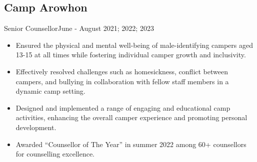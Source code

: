 \subsection{Camp Arowhon}{Senior Counsellor}{June - August 2021; 2022; 2023}
\begin{itemize}
    \item Ensured the physical and mental well-being of male-identifying campers aged 13-15 at all times while fostering individual camper growth and inclusivity. 
    \item Effectively resolved challenges such as homesickness, conflict between campers, and bullying in collaboration with fellow staff members in a dynamic camp setting.
    \item Designed and implemented a range of engaging and educational camp activities, enhancing the overall camper experience and promoting personal development.
    \item Awarded ``Counsellor of The Year'' in summer 2022 among 60+ counsellors for counselling excellence.
\end{itemize}